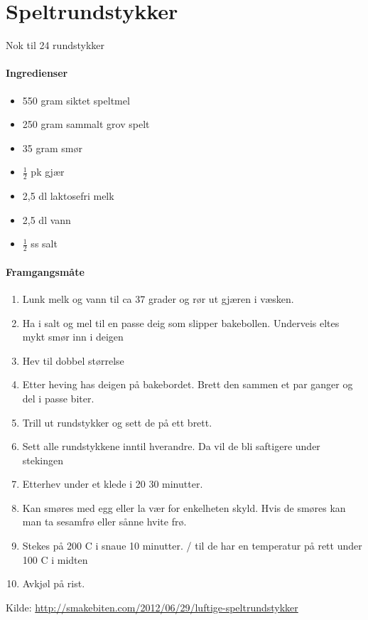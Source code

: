 \section{Speltrundstykker}
Nok til 24 rundstykker

\paragraph{Ingredienser}
\begin{itemize}[noitemsep]
	\item 550 gram siktet speltmel
	\item 250 gram sammalt grov spelt
	\item 35 gram smør
	\item  $\frac{1}{2}$  pk gjær
	\item 2,5 dl laktosefri melk
	\item 2,5 dl vann
	\item  $\frac{1}{2}$  ss salt
\end{itemize}


\paragraph{Framgangsmåte}
\begin{enumerate}[noitemsep]
	\item Lunk melk og vann til ca 37 grader og rør ut gjæren i væsken.
	\item Ha i salt og mel til en passe deig som slipper bakebollen. Underveis eltes mykt smør inn i deigen
	\item Hev til dobbel størrelse
	\item Etter heving has deigen på bakebordet. Brett den sammen et par ganger og del i passe biter.
	\item Trill ut rundstykker og sett de på ett brett.
	\item Sett alle rundstykkene inntil hverandre. Da vil de bli saftigere under stekingen
	\item Etterhev under et klede i 20 30 minutter.
	\item Kan smøres med egg eller la vær for enkelheten skyld. Hvis de smøres kan man ta sesamfrø eller sånne hvite frø.
	\item Stekes på 200 \degree C i snaue 10 minutter. / til de har en temperatur på rett under 100 \degree C i midten
	\item Avkjøl på rist.
\end{enumerate}

Kilde: \url{http://smakebiten.com/2012/06/29/luftige-speltrundstykker}
